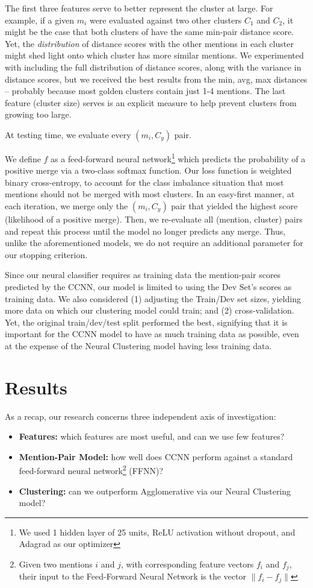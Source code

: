 \documentclass[11pt,a4paper]{article}
\begin{document}
The first three features serve to better represent the cluster at large.  For example, if a given $m_i$ were evaluated against two other clusters $C_1$ and $C_2$, it might be the case that both clusters of have the same min-pair distance score.  Yet, the \textit{distribution} of distance scores with the other mentions in each cluster might shed light onto which cluster has more similar mentions.  We experimented with including the full distribution of distance scores, along with the variance in distance scores, but we received the best results from the min, avg, max distances -- probably because most golden clusters contain just 1-4 mentions.  The last feature (cluster size) serves is an explicit measure to help prevent clusters from growing too large.

At testing time, we evaluate every $(m_i, C_y)$ pair.  

We define $f$ as a feed-forward neural network\footnote{We used 1 hidden layer of 25 units, ReLU activation without dropout, and Adagrad as our optimizer} which predicts the probability of a positive merge via a two-class softmax function.  Our loss function is weighted binary cross-entropy, to account for the class imbalance situation that most mentions should not be merged with most clusters.  In an easy-first manner, at each iteration, we merge only the $(m_i,C_y)$ pair that yielded the highest score (likelihood of a positive merge).  Then, we re-evaluate all (mention, cluster) pairs and repeat this process until the model no longer predicts any merge.  Thus, unlike the aforementioned models, we do not require an additional parameter for our stopping criterion.

Since our neural classifier requires as training data the mention-pair scores predicted by the CCNN, our model is limited to using the Dev Set's scores as training data.  We also considered (1) adjusting the Train/Dev set sizes, yielding more data on which our clustering model could train; and (2) cross-validation.  Yet, the original train/dev/test split performed the best, signifying that it is important for the CCNN model to have as much training data as possible, even at the expense of the Neural Clustering model having less training data.

\section{Results}
As a recap, our research concerns three independent axis of investigation:
\begin{itemize}
\item \textbf{Features:} which features are most useful, and can we use few features?
\item \textbf{Mention-Pair Model:} how well does CCNN perform against a standard feed-forward neural network\footnote{Given two mentions $i$ and $j$, with corresponding feature vectors $f_i$ and $f_j$, their input to the Feed-Forward Neural Network is the vector $\|f_{i} - f_{j}\|$} (FFNN)?
\item \textbf{Clustering:} can we outperform Agglomerative via our Neural Clustering model?
\end{itemize}
\end{document}
